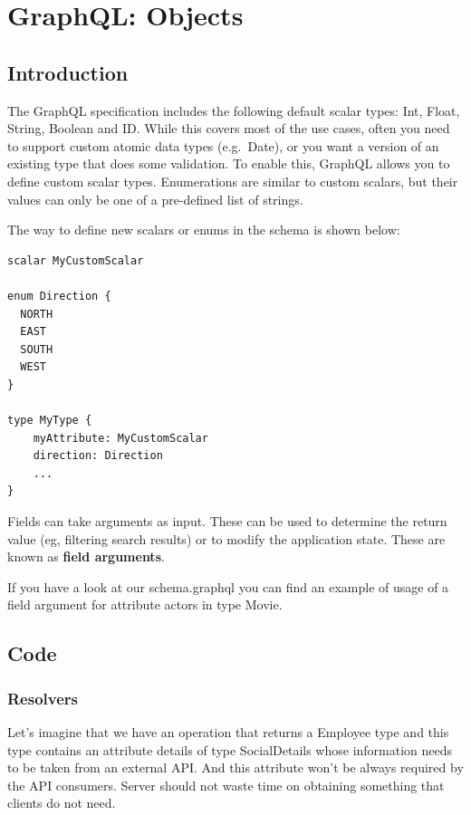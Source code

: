 \documentclass[]{book}
\begin{document}
\chapter{GraphQL: Objects}\label{graphql-objects}

\section{Introduction}\label{introduction-1}

The GraphQL specification includes the following default scalar types:
Int, Float, String, Boolean and ID. While this covers most of the use
cases, often you need to support custom atomic data types (e.g.~Date),
or you want a version of an existing type that does some validation. To
enable this, GraphQL allows you to define custom scalar types.
Enumerations are similar to custom scalars, but their values can only be
one of a pre-defined list of strings.

The way to define new scalars or enums in the schema is shown below:

\begin{verbatim}
scalar MyCustomScalar

enum Direction {
  NORTH
  EAST
  SOUTH
  WEST
}

type MyType {
    myAttribute: MyCustomScalar
    direction: Direction
    ...
}
\end{verbatim}

Fields can take arguments as input. These can be used to determine the
return value (eg, filtering search results) or to modify the application
state. These are known as \textbf{field arguments}.

If you have a look at our schema.graphql you can find an example of
usage of a field argument for attribute actors in type Movie.

\section{Code}\label{code}

\subsection{Resolvers}\label{resolvers}

Let's imagine that we have an operation that returns a Employee type and
this type contains an attribute details of type SocialDetails whose
information needs to be taken from an external API. And this attribute
won't be always required by the API consumers. Server should not waste
time on obtaining something that clients do not need.
\end{document}
